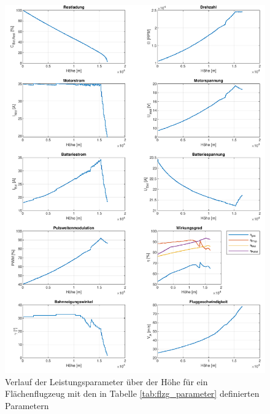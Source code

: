 \begin{figure}[H]
	\includegraphics[scale=0.7]{Diagramme/Ausgangskonstellation.pdf}
	\caption{Verlauf der Leistungsparameter über der Höhe für ein Flächenflugzeug mit den in Tabelle \ref{tab:flzg_parameter} definierten Parametern}
	\label{abb:referenzkonfiguration}
\end{figure}

